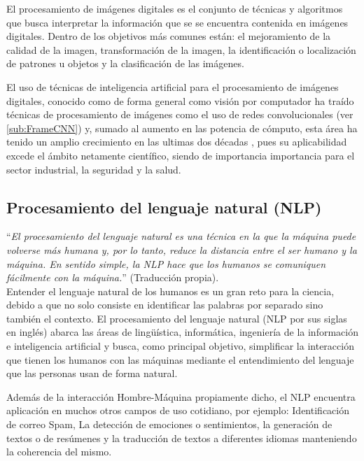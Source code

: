         El procesamiento de imágenes digitales es el conjunto de técnicas  y algoritmos que busca interpretar la información que se se encuentra contenida en imágenes digitales. Dentro de los objetivos más comunes están: el mejoramiento de la calidad de la imagen, transformación de la imagen, la identificación o localización de patrones u objetos y la clasificación de las imágenes.
        
        El uso de técnicas de inteligencia artificial para el procesamiento de imágenes digitales, conocido como de forma general como visión por computador ha traído técnicas de procesamiento de imágenes como el uso de redes convolucionales (ver \ref{sub:FrameCNN}) y, sumado al aumento en las potencia de cómputo, esta área ha tenido un amplio crecimiento en las ultimas dos décadas \cite{Qin2020, Bora2020, Rojas2019heart}, pues su aplicabilidad excede el ámbito netamente científico, siendo de importancia importancia para el sector industrial, la seguridad y la salud.
    
    \subsection{Procesamiento del lenguaje natural (NLP)}
    \label{sub:FrameNLProccesing}
    
        ``\textit{El procesamiento del lenguaje natural es una técnica en la que la máquina puede volverse más humana y, por lo tanto, reduce la distancia entre el ser humano y la máquina. En sentido simple, la NLP hace que los humanos se comuniquen fácilmente con la máquina.}'' \cite{Surabhi2013} (Traducción propia).\\
    
        Entender el lenguaje natural de los humanos es un gran reto para la ciencia, debido a que no solo consiste en identificar las palabras por separado sino también el contexto. El procesamiento del lenguaje natural (NLP por sus siglas en inglés) abarca las áreas  de lingüística, informática, ingeniería de la información e inteligencia artificial y busca, como principal objetivo, simplificar la interacción que tienen los humanos con las máquinas mediante el entendimiento del lenguaje que las personas usan de forma natural.
        
        Además de la interacción Hombre-Máquina propiamente dicho, el NLP encuentra aplicación en muchos otros campos de uso cotidiano, por ejemplo: Identificación de correo Spam, La detección de emociones o sentimientos, la generación de textos o de resúmenes y la traducción de textos a diferentes idiomas manteniendo la coherencia del mismo.
        
